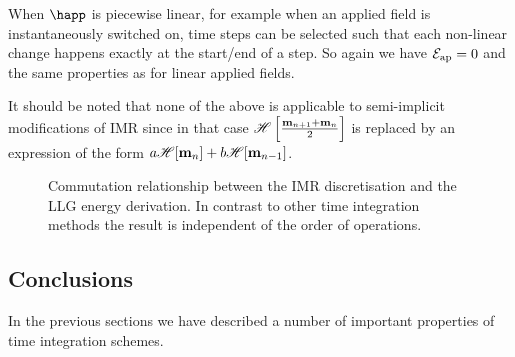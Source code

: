 When $\happ$ is piecewise linear, for example when an applied field is instantaneously switched on, time steps can be selected such that each non-linear change happens exactly at the start/end of a step.
So again we have $\mathcal{E}_\text{ap} = 0$ and the same properties as for linear applied fields.

It should be noted that none of the above is applicable to semi-implicit modifications of IMR since in that case $\mathscr{H} \left[ \frac{\boldsymbol{\mathrm{m}}_{n+1} + \boldsymbol{\mathrm{m}}_n}{2} \right]$ is replaced by an expression of the form $a\mathscr{H} {\left[ \boldsymbol{\mathrm{m}}_n \right]} + b\mathscr{H} {\left[ \boldsymbol{\mathrm{m}}_{n-1} \right]}$.

\begin{figure}
  \centering
  \caption{Commutation relationship between the IMR discretisation and the LLG energy derivation.
In contrast to other time integration methods the result is independent of the order of operations.}
\label{fig:commutation-imr-energy}
\end{figure}


\subsection{Conclusions}

In the previous sections we have described a number of important properties of time integration schemes.

